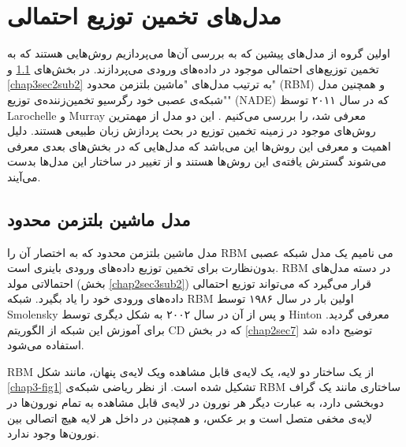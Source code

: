 \section{مدل‌های تخمین توزیع احتمالی}
\label{sec2}
اولین گروه از مدل‌های پیشین که به بررسی‌ آن‌ها می‌‌پردازیم روش‌هایی هستند که به تخمین توزیع‌های احتمالی‌ موجود در داده‌های ورودی می‌‌پردازند. در بخش‌های
\ref{chap3sec2sub1}
و
\ref{chap3sec2sub2}
به ترتیب مدل‌های "ماشین بلتزمن محدود"
(RBM)
\cite{smolensky1986information}\cite{freund1994unsupervised}\cite{hinton2002training}
 و همچنین مدل "شبکه‌‌ی عصبی خود رگرسیو تخمین‌زننده‌ی توزیع"
(NADE)
  که در سال
۲۰۱۱
توسظ 
Larochelle
و
Murray \cite{larochelle2011neural}
معرفی شد، را بررسی می‌کنیم . این دو مدل از مهمترین روش‌های موجود در زمینه تخمین توزیع در بحث پردازش زبان طبیعی هستند. دلیل اهمیت و معرفی‌ این روش‌ها این می‌‌‌باشد که مدل‌هایی که در بخش‌های بعدی معرفی‌ می‌‌شوند گسترش یافته‌ی این روش‌ها هستند و از تغییر در ساختار این مدل‌ها بدست می‌‌آیند.

	
	
	\subsection{مدل ماشین بلتزمن محدود}
	\label{chap3sec2sub1}
	مدل ماشین بلتزمن محدود که به اختصار آن را
	RBM
	می‌ نامیم یک مدل شبکه عصبی بدون‌نظارت برای تخمین توزیع داده‌های ورودی باینری است. 
	RBM
	در دسته مدل‌های احتمالاتی مولد
	 (بخش 
	 \ref{chap2sec3sub2})
	 قرار می‌‌گیرد که می‌‌تواند توزیع احتمالی‌ داده‌های ورودی خود را یاد بگیرد.
	 شبکه
	 RBM
	 اولین بار در سال ۱۹۸۶ توسط	  
	 Smolensky \cite{smolensky1986information}
	  و پس از آن در سال ۲۰۰۲ به شکل دیگری توسط
	 Hinton \cite{hinton2002training}
	  معرفی‌ گردید. برای آموزش این شبکه از الگوریتم
	 CD
	 که در بخش
	 \ref{chap2sec7}
	 توضیح داده شد استفاده می‌‌شود.
	 
	RBM
	 از یک ساختار دو لایه، یک لایه‌ی قابل مشاهده ویک لایه‌ی پنهان، مانند شکل
	\ref{chap3-fig1}
	تشکیل شده است.
 از نظر ریاضی‌ شبکه‌ی
	RBM
	ساختاری مانند یک گراف دوبخشی دارد، به عبارت دیگر هر نورون در لایه‌ی قابل مشاهده به تمام نورون‌ها در لایه‌ی مخفی‌ متصل است و بر عکس، و همچنین در داخل هر لایه هیچ اتصالی بین نورون‌ها وجود ندارد.
	

